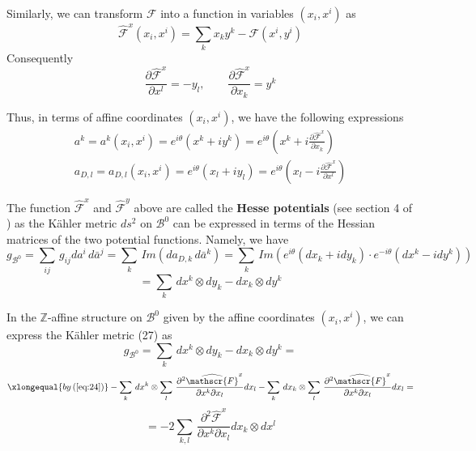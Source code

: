 \documentclass{article}
\begin{document}
Similarly, we can transform $\mathscr{F}$ into a function in variables $(x_{i},x^{i})$ as 
\begin{equation}
    \widehat{\mathscr{F}}^{x}(x_{i},x^{i})=\sum_{k}x_{k}y^{k}-\mathscr{F}(x^{i},y^{i})
\end{equation}
Consequently
\begin{equation}\label{eq:24}
    \frac{\partial\widehat{\mathscr{F}}^{x}}{\partial x^{l}}=-y_{l},\qquad\frac{\partial\widehat{\mathscr{F}}^{x}}{\partial x_{k}}=y^{k}
\end{equation}


Thus, in terms of affine coordinates $(x_{i},x^{i})$, we have the following expressions
\begin{align}
    a^{k}=a^{k}(x_{i},x^{i})=e^{i\theta}(x^{k}+iy^{k})=e^{i\theta}\left(x^{k}+i\frac{\partial\mathscr{\widehat{F}}^{x}}{\partial x_{k}}\right)\\
    a_{D,l}=a_{D,l}(x_{i},x^{i})=e^{i\theta}(x_{l}+iy_{l})=e^{i\theta}\left(x_{l}-i\frac{\partial\widehat{\mathscr{F}}^{x}}{\partial x^{l}}\right)
\end{align}

The function $\widehat{\mathscr{F}}^{x}$ and  $\widehat{\mathscr{F}}^{y}$ above are called the \textbf{Hesse potentials} (see section 4 of \cite{svan2012bps}) as the K\"ahler metric $ds^{2}$ on $\mathcal{B}^{0}$ can be expressed in terms of the Hessian matrices of the two potential functions. Namely, we have
        \[g_{\mathcal{B}^{0}}=\sum_{ij}\,g_{ij}da^{i}\,d\bar{a}^{j}=\sum_{k}\,Im\left(da_{D,k}\,d\bar{a}^{k}\right) =\sum_{k}\,Im\left(e^{i\theta}(dx_{k}+idy_{k})\cdot e^{-i\theta}(dx^{k}-idy^{k})\right)\]
        \begin{equation}
          =\sum_{k}\,dx^{k}\otimes dy_{k}-dx_{k}\otimes dy^{k}  
        \end{equation}
    
In the $\mathbb{Z}$-affine structure on $\mathcal{B}^{0}$ given by the affine coordinates $(x_{i},x^{i})$, we can express the K\"ahler metric (27) as 
\[ g_{\mathcal{B}^{0}}=\sum_{k}\,dx^{k}\otimes dy_{k}-dx_{k}\otimes dy^{k}=\]
\begin{equation*}
        \xlongequal{by\,(\ref{eq:24})}-\sum_{k}\,dx^{k}\otimes\sum_{l}\,\frac{\partial^{2}\widehat{\mathscr{F}}^{x}}{\partial x^{k}\partial x_{l}}dx_{l}-\sum_{k}\,dx_{k}\otimes\sum_{l}\,\frac{\partial^{2}\widehat{\mathscr{F}}^{x}}{\partial x^{k}\partial x_{l}}dx_{l}=
\end{equation*}
\begin{equation}
    =-2\sum_{k,l}\,\frac{\partial^{2}\widehat{\mathscr{F}}^{x}}{\partial x^{k}\partial x_{l}}dx_{k}\otimes dx^{l}
\end{equation}
\end{document}
